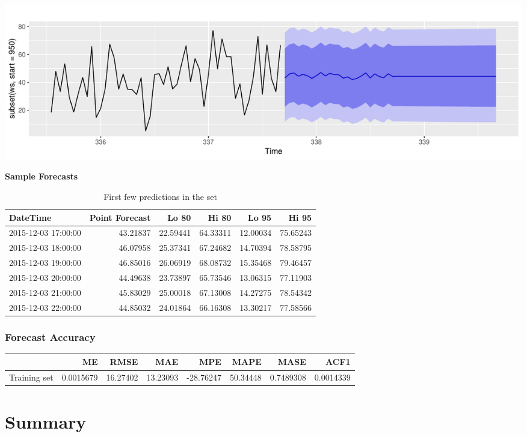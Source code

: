 \documentclass[openany]{book}
\begin{document}
\includegraphics{Part-C-BP_files/figure-latex/unnamed-chunk-14-1.pdf}

\textbf{Sample Forecasts}

\begin{table}[t]

\caption{\label{tab:unnamed-chunk-15}First few predictions in the set}
\centering
\begin{tabular}{l|r|r|r|r|r}
\hline
DateTime & Point Forecast & Lo 80 & Hi 80 & Lo 95 & Hi 95\\
\hline
2015-12-03 17:00:00 & 43.21837 & 22.59441 & 64.33311 & 12.00034 & 75.65243\\
\hline
2015-12-03 18:00:00 & 46.07958 & 25.37341 & 67.24682 & 14.70394 & 78.58795\\
\hline
2015-12-03 19:00:00 & 46.85016 & 26.06919 & 68.08732 & 15.35468 & 79.46457\\
\hline
2015-12-03 20:00:00 & 44.49638 & 23.73897 & 65.73546 & 13.06315 & 77.11903\\
\hline
2015-12-03 21:00:00 & 45.83029 & 25.00018 & 67.13008 & 14.27275 & 78.54342\\
\hline
2015-12-03 22:00:00 & 44.85032 & 24.01864 & 66.16308 & 13.30217 & 77.58566\\
\hline
\end{tabular}
\end{table}

\hypertarget{forecast-accuracy}{%
\subsubsection{Forecast Accuracy}\label{forecast-accuracy}}

\begin{tabular}{l|r|r|r|r|r|r|r}
\hline
  & ME & RMSE & MAE & MPE & MAPE & MASE & ACF1\\
\hline
Training set & 0.0015679 & 16.27402 & 13.23093 & -28.76247 & 50.34448 & 0.7489308 & 0.0014339\\
\hline
\end{tabular}

\hypertarget{summary}{%
\section{Summary}\label{summary}}
\end{document}
